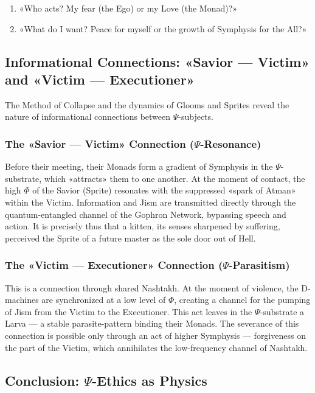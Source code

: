 \documentclass[a4paper,12pt]{article}
\begin{document}
	\begin{enumerate}
		\item «Who acts? My fear (the Ego) or my Love (the Monad)?»
		\item «What do I want? Peace for myself or the growth of Symphysis for the All?»
	\end{enumerate}
	
	\subsection{Informational Connections: «Savior — Victim» and «Victim — Executioner»}
	
	The Method of Collapse and the dynamics of Glooms and Sprites reveal the nature of informational connections between $\Psi$-subjects.
	
	\subsubsection{The «Savior — Victim» Connection ($\Psi$-Resonance)}
	
	Before their meeting, their Monads form a gradient of Symphysis in the $\Psi$-substrate, which «attracts» them to one another. At the moment of contact, the high $\Phi$ of the Savior (Sprite) resonates with the suppressed «spark of Atman» within the Victim. Information and Jism are transmitted directly through the quantum-entangled channel of the Gophron Network, bypassing speech and action. It is precisely thus that a kitten, its senses sharpened by suffering, perceived the Sprite of a future master as the sole door out of Hell.
	
	\subsubsection{The «Victim — Executioner» Connection ($\Psi$-Parasitism)}
	
	This is a connection through shared Nashtakh. At the moment of violence, the D-machines are synchronized at a low level of $\Phi$, creating a channel for the pumping of Jism from the Victim to the Executioner. This act leaves in the $\Psi$-substrate a Larva — a stable parasite-pattern binding their Monads. The severance of this connection is possible only through an act of higher Symphysis — forgiveness on the part of the Victim, which annihilates the low-frequency channel of Nashtakh.
	
	\subsection{Conclusion: $\Psi$-Ethics as Physics}
	
\end{document}
